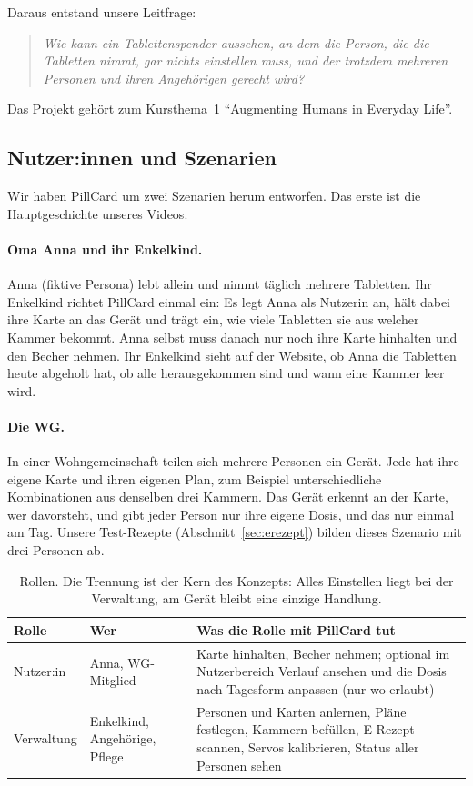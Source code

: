 \documentclass[11pt,a4paper]{article}
\begin{document}
Daraus entstand unsere Leitfrage:
\begin{quote}
\emph{Wie kann ein Tablettenspender aussehen, an dem die Person, die die Tabletten nimmt, gar nichts
einstellen muss, und der trotzdem mehreren Personen und ihren Angehörigen gerecht wird?}
\end{quote}

Das Projekt gehört zum Kursthema~1 \enquote{Augmenting Humans in Everyday Life}.

\subsection{Nutzer:innen und Szenarien}

Wir haben PillCard um zwei Szenarien herum entworfen. Das erste ist die Hauptgeschichte unseres Videos.

\paragraph{Oma Anna und ihr Enkelkind.}
Anna (fiktive Persona) lebt allein und nimmt täglich mehrere Tabletten. Ihr Enkelkind richtet PillCard
einmal ein: Es legt Anna als Nutzerin an, hält dabei ihre Karte an das Gerät und trägt ein, wie viele
Tabletten sie aus welcher Kammer bekommt. Anna selbst muss danach nur noch ihre Karte hinhalten und den
Becher nehmen. Ihr Enkelkind sieht auf der Website, ob Anna die Tabletten heute abgeholt hat, ob alle
herausgekommen sind und wann eine Kammer leer wird.

\paragraph{Die WG.}
In einer Wohngemeinschaft teilen sich mehrere Personen ein Gerät. Jede hat ihre eigene Karte und ihren
eigenen Plan, zum Beispiel unterschiedliche Kombinationen aus denselben drei Kammern. Das Gerät erkennt
an der Karte, wer davorsteht, und gibt jeder Person nur ihre eigene Dosis, und das nur einmal am Tag.
Unsere Test-Rezepte (Abschnitt~\ref{sec:erezept}) bilden dieses Szenario mit drei Personen ab.

\begin{table}[H]
\centering
\small
\begin{tabularx}{\linewidth}{@{}l Y Y@{}}
\toprule
\textbf{Rolle} & \textbf{Wer} & \textbf{Was die Rolle mit PillCard tut} \\
\midrule
Nutzer:in & Anna, WG-Mitglied & Karte hinhalten, Becher nehmen; optional im Nutzerbereich Verlauf ansehen und
  die Dosis nach Tagesform anpassen (nur wo erlaubt) \\
Verwaltung & Enkelkind, Angehörige, Pflege & Personen und Karten anlernen, Pläne festlegen, Kammern
  befüllen, E-Rezept scannen, Servos kalibrieren, Status aller Personen sehen \\
\bottomrule
\end{tabularx}
\caption{Rollen. Die Trennung ist der Kern des Konzepts: Alles Einstellen liegt bei der Verwaltung, am
Gerät bleibt eine einzige Handlung.}
\label{tab:rollen}
\end{table}
\end{document}

